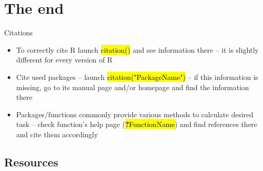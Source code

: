 \documentclass[compress, ucs, xelatex, 11pt, xcolor=svgnames,
  hyperref={
    bookmarks=true,
    unicode=true,
    colorlinks=true,
    pdftitle={Molecular data in R},
    plainpages=false,
    pdfauthor={Vojtech Zeisek},
    pdfsubject={Course about phylogeny and evolution in R},
    pdfcreator={XeLaTeX},
    pdfkeywords={R, evolution, phylogeny, molecular data},
    linkcolor=Tomato,
    anchorcolor=SaddleBrown,
    citecolor=Goldenrod,
    filecolor=DarkMagenta,
    menucolor=Sienna,
    urlcolor=DarkTurquoise,
    pdftex},
  url={hyphens, lowtilde} %
  ]{beamer}
\renewcommand{\texttt}[1]{\hl{\ttfamily #1}}
\begin{document}
\section{The end}

\begin{frame}{Citations}
\begin{itemize}
  \item To correctly cite R launch \texttt{citation()} and see information there -- it is slightly different for every version of R
  \item Cite used packages -- launch \texttt{citation("PackageName")} -- if this information is missing, go to its manual page and/or homepage and find the information there
  \item Packages/functions commonly provide various methods to calculate desired task -- check function's help page (\texttt{\textbf{?}FunctionName}) and find references there and cite them accordingly
\end{itemize}
\end{frame}

\subsection{Resources}
\end{document}

